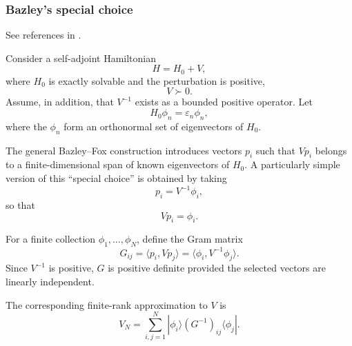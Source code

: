 \documentclass{article}
\theoremstyle{definition}
\begin{document}
\subsubsection{Bazley's special choice}

See references in \cite{paper:Marmorino2008,paper:Marmorino2011,book:WeinsteinStenger1972}.

Consider a self-adjoint Hamiltonian
\begin{equation}
    H = H_0 + V ,
\end{equation}
where \(H_0\) is exactly solvable and the perturbation is positive,
\begin{equation}
    V \succ 0 .
\end{equation}
Assume, in addition, that \(V^{-1}\) exists as a bounded positive
operator.  Let
\begin{equation}
    H_0 \phi_n = \varepsilon_n \phi_n ,
\end{equation}
where the \(\phi_n\) form an orthonormal set of eigenvectors of
\(H_0\).

The general Bazley--Fox construction introduces vectors \(p_i\)
such that \(V p_i\) belongs to a finite-dimensional span of known
eigenvectors of \(H_0\).  A particularly simple version of this
``special choice'' is obtained by taking
\begin{equation}
    p_i = V^{-1}\phi_i ,
\end{equation}
so that
\begin{equation}
    Vp_i = \phi_i .
\end{equation}

For a finite collection
\(\phi_1,\ldots,\phi_N\), define the Gram matrix
\begin{equation}
    G_{ij}
    =
    \langle p_i , Vp_j\rangle
    =
    \langle \phi_i , V^{-1}\phi_j\rangle .
    \label{eq:BF-G}
\end{equation}
Since \(V^{-1}\) is positive, \(G\) is positive definite provided
the selected vectors are linearly independent.

The corresponding finite-rank approximation to \(V\) is
\begin{equation}
    V_N
    =
    \sum_{i,j=1}^{N}
    |\phi_i\rangle
    (G^{-1})_{ij}
    \langle\phi_j| .
    \label{eq:BF-VN}
\end{equation}
\end{document}
